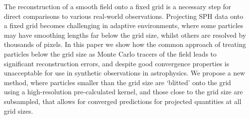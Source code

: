 The reconstruction of a smooth field onto a fixed grid is a necessary step for direct comparisons to various real-world observations. Projecting SPH data onto a fixed grid becomes challenging in adaptive environments, where some particles may have smoothing lengths far below the grid size, whilst others are resolved by thousands of pixels. In this paper we show how the common approach of treating particles below the grid size as Monte Carlo tracers of the field leads to significant reconstruction errors, and despite good convergence properties is unacceptable for use in synthetic observations in astrophysics. We propose a new method, where particles smaller than the grid size are `blitted' onto the grid using a high-resolution pre-calculated kernel, and those close to the grid size are subsampled, that allows for converged predictions for projected quantities at all grid sizes.